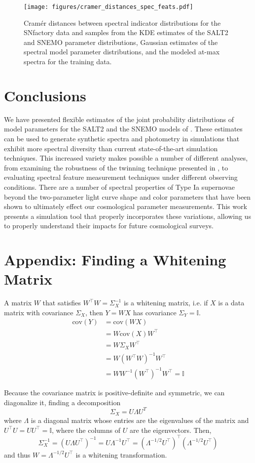 \begin{figure}
    \centering
    \texttt{[image: figures/cramer\_distances\_spec\_feats.pdf]}
    \caption{Cram\'{e}r distances between spectral indicator distributions for the SNfactory data and samples from the KDE estimates of the SALT2 and SNEMO parameter distributions, Gaussian estimates of the spectral model parameter distributions, and the modeled at-max spectra for the training data.}
    \label{fig:cramer_spec_feat}
\end{figure}

\section{Conclusions}
\label{sec:conclusions}
We have presented flexible estimates of the joint probability distributions of model parameters for the SALT2 and the SNEMO models of \cite{Saunders2018}. These estimates can be used to generate synthetic spectra and photometry in simulations that exhibit more spectral diversity than current state-of-the-art simulation techniques. This increased variety makes possible a number of different analyses, from examining the robustness of the twinning technique presented in \cite{Fakhouri2015}, to evaluating spectral feature measurement techniques under different observing conditions. There are a number of spectral properties of Type Ia supernovae beyond the two-parameter light curve shape and color parameters that have been shown to ultimately effect our cosmological parameter measurements. This work presents a simulation tool that properly incorporates these variations, allowing us to properly understand their impacts for future cosmological surveys.

\section{Appendix: Finding a Whitening Matrix}
\label{app:whitening_matrix_proof}
A matrix $W$ that satisfies $W^\top W=\Sigma_X^{-1}$ is a whitening matrix, i.e. if $X$ is a data matrix with covariance $\Sigma_X$, then $Y=WX$ has covariance $\Sigma_Y=\mathbb{I}$.
\begin{align*}
    \textrm{cov}(Y) & = \textrm{cov}(WX)\\
    & = W\textrm{cov}(X)W^\top \\
    & = W\Sigma_X W^\top \\
    & = W(W^\top W)^{-1}W^\top \\
    & = WW^{-1}(W^\top)^{-1}W^\top = \mathbb{I}
\end{align*}

Because the covariance matrix is positive-definite and symmetric, we can diagonalize it, finding a decomposition
$$\Sigma_X = U\Lambda U^T$$
where $\Lambda$ is a diagonal matrix whose entries are the eigenvalues of the matrix and $U^\top U = UU^\top = \mathbb{I}$, where the columns of $U$ are the eigenvectors. Then,
$$\Sigma_X^{-1}=(U\Lambda U^\top)^{-1} = U\Lambda^{-1}U^\top = (\Lambda^{-1/2}U^\top)^\top(\Lambda^{-1/2}U^\top)$$
and thus $W = \Lambda^{-1/2}U^\top$ is a whitening transformation.
